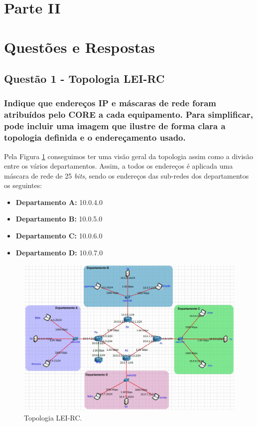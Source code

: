 

\newpage
\section*{\hfil Parte II\hfil}

\section{Questões e Respostas}

\subsection{Questão 1 - Topologia LEI-RC}
\subsubsection{Indique que endereços IP e máscaras de rede foram atribuídos pelo CORE a cada equipamento. Para simplificar, pode incluir uma imagem que ilustre de forma clara a topologia definida e o endereçamento usado.}

    Pela Figura \ref{parteII-questao1-topologia} conseguimos ter uma visão geral da topologia assim como a divisão entre os vários departamentos. Assim, a todos os endereços é aplicada uma máscara de rede de 25  \textit{bits}, sendo os endereços das sub-redes dos departamentos os seguintes: 

    \begin{multicols}{2}
    \begin{itemize}
        \item \textbf{Departamento A:} 10.0.4.0 
        \item \textbf{Departamento B:} 10.0.5.0 
        \item \textbf{Departamento C:} 10.0.6.0 
        \item \textbf{Departamento D:} 10.0.7.0 
    \end{itemize}
    \end{multicols}


    \begin{figure}[H]
    \centering
    \includegraphics[width=500pt]{images/ParteII/Questao1/TopologiaOriginal.jpg}
    \caption{Topologia LEI-RC.} \label{parteII-questao1-topologia}
    \end{figure}
    
